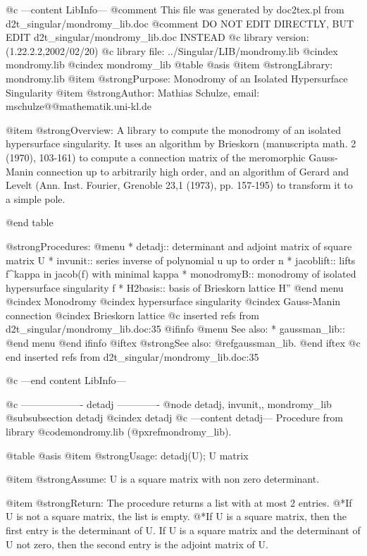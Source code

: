 @c ---content LibInfo---
@comment This file was generated by doc2tex.pl from d2t_singular/mondromy_lib.doc
@comment DO NOT EDIT DIRECTLY, BUT EDIT d2t_singular/mondromy_lib.doc INSTEAD
@c library version: (1.22.2.2,2002/02/20)
@c library file: ../Singular/LIB/mondromy.lib
@cindex mondromy.lib
@cindex mondromy_lib
@table @asis
@item @strong{Library:}
mondromy.lib
@item @strong{Purpose:}
  Monodromy of an Isolated Hypersurface Singularity
@item @strong{Author:}
Mathias Schulze, email: mschulze@@mathematik.uni-kl.de

@item @strong{Overview:}
A library to compute the monodromy of an isolated hypersurface singularity.
It uses an algorithm by Brieskorn (manuscripta math. 2 (1970), 103-161) to
compute a connection matrix of the meromorphic Gauss-Manin connection up to
arbitrarily high order, and an algorithm of Gerard and Levelt (Ann. Inst.
Fourier, Grenoble 23,1 (1973), pp. 157-195) to transform it to a simple pole.

@end table

@strong{Procedures:}
@menu
* detadj:: determinant and adjoint matrix of square matrix U
* invunit:: series inverse of polynomial u up to order n
* jacoblift:: lifts f^kappa in jacob(f) with minimal kappa
* monodromyB:: monodromy of isolated hypersurface singularity f
* H2basis:: basis of Brieskorn lattice H''
@end menu
@cindex Monodromy
@cindex hypersurface singularity
@cindex Gauss-Manin connection
@cindex Brieskorn lattice
@c inserted refs from d2t_singular/mondromy_lib.doc:35
@ifinfo
@menu
See also:
* gaussman_lib::
@end menu
@end ifinfo
@iftex
@strong{See also:}
@ref{gaussman_lib}.
@end iftex
@c end inserted refs from d2t_singular/mondromy_lib.doc:35

@c ---end content LibInfo---

@c ------------------- detadj -------------
@node detadj, invunit,, mondromy_lib
@subsubsection detadj
@cindex detadj
@c ---content detadj---
Procedure from library @code{mondromy.lib} (@pxref{mondromy_lib}).

@table @asis
@item @strong{Usage:}
detadj(U); U matrix

@item @strong{Assume:}
U is a square matrix with non zero determinant.

@item @strong{Return:}
The procedure returns a list with at most 2 entries.
@*If U is not a square matrix, the list is empty.
@*If U is a square matrix, then the first entry is the determinant of U.
If U is a square matrix and the determinant of U not zero,
then the second entry is the adjoint matrix of U.

